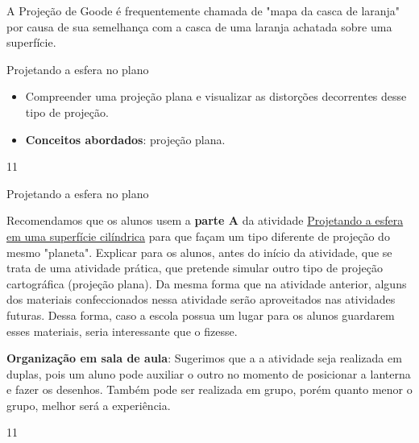 A Projeção de Goode é frequentemente chamada de "mapa da casca de laranja" por causa de sua semelhança com a casca de uma laranja  achatada sobre uma superfície.
\clearpage
\def\currentcolor{session1}
\begin{objectives}{Projetando a esfera no plano}
{
  \begin{itemize}
  \item Compreender uma projeção plana e visualizar as distorções decorrentes desse tipo de projeção.
  \item \textbf{Conceitos abordados}: projeção plana.
  \end{itemize}
}{1}{1}
\end{objectives}
\begin{sugestions}{Projetando a esfera no plano}
{
  Recomendamos que os alunos usem a \textbf{parte A} da atividade \hyperref[proj_cil]{Projetando a esfera em uma superfície cilíndrica} para que façam um tipo diferente de projeção do mesmo "planeta". Explicar para os alunos, antes do início da atividade, que se trata de uma atividade prática, que pretende simular outro tipo de projeção cartográfica (projeção plana). Da mesma forma que na atividade anterior, alguns dos materiais confeccionados nessa atividade serão aproveitados nas atividades futuras. Dessa forma, caso a escola possua um lugar para os alunos guardarem esses materiais, seria interessante que o fizesse.

  \textbf{Organização em sala de aula}: Sugerimos que a a atividade seja realizada em duplas, pois um aluno pode auxiliar o outro no momento de posicionar a lanterna e fazer os desenhos. Também pode ser realizada em grupo, porém quanto menor o grupo, melhor será a experiência.
}{1}{1}
\end{sugestions}
\clearmargin

